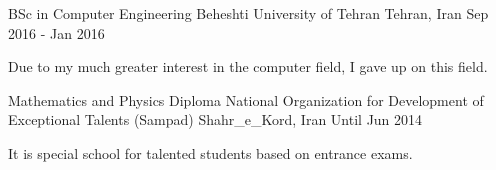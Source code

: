 \begin{cventries}
    \cventry
    {BSc in Computer Engineering} %
    {Beheshti University of Tehran} %
    {Tehran, Iran} %
    {Sep 2016 - Jan 2016} %
    {
      \begin{cvitems} %
        \item {Due to my much greater interest in the computer field, I gave up on this field.}
      \end{cvitems}
    }
    
    \cventry
    {Mathematics and Physics Diploma} %
    {National Organization for Development of Exceptional Talents (Sampad)} %
    {Shahr\_e\_Kord, Iran} %
    {Until Jun 2014} %
    {
      \begin{cvitems} %
        \item {It is special school for talented students based on entrance exams.}
      \end{cvitems}
    }

\end{cventries}
